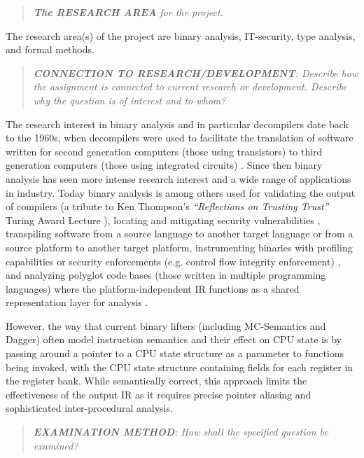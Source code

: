 \documentclass[12pt, a4paper]{article}
\begin{document}
\begin{quote}
	\textit{\textbf{The RESEARCH AREA} for the project.}
\end{quote}

The research area(s) of the project are binary analysis, IT-security, type analysis, and formal methods.

\begin{quote}
	\textit{\textbf{CONNECTION TO RESEARCH/DEVELOPMENT}: Describe how the assignment is connected to current research or development. Describe why the question is of interest and to whom?}
\end{quote}

The research interest in binary analysis and in particular decompilers date back to the 1960s, when decompilers were used to facilitate the translation of software written for second generation computers (those using transistors) to third generation computers (those using integrated circuits) \cite{reverse_compilation}. Since then binary analysis has seen more intense research interest and a wide range of applications in industry. Today binary analysis is among others used for validating the output of compilers (a tribute to Ken Thompson's \textit{``Reflections on Trusting Trust''} Turing Award Lecture \cite{trusting_trust}), locating and mitigating security vulnerabilities \cite{state_of_the_art_of_war}, transpiling software from a source language to another target language or from a source platform to another target platform, instrumenting binaries with profiling capabilities or security enforcements (e.g. control flow integrity enforcement) \cite{superset_disassembly}, and analyzing polyglot code bases (those written in multiple programming languages) where the platform-independent IR functions as a shared representation layer for analysis \cite{revgen}.

However, the way that current binary lifters (including MC-Semantics and Dagger) often model instruction semantics and their effect on CPU state is by passing around a pointer to a CPU state structure as a parameter to functions being invoked, with the CPU state structure containing fields for each register in the register bank. While semantically correct, this approach limits the effectiveness of the output IR as it requires precise pointer aliasing and sophisticated inter-procedural analysis.


\begin{quote}
	\textit{\textbf{EXAMINATION METHOD}: How shall the specified question be examined?}
\end{quote}
\end{document}
